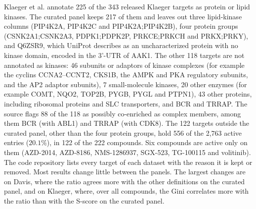 \documentclass[11pt]{article}
\begin{document}
Klaeger et al.\cite{Klaeger2017} annotate 225 of the 343 released Klaeger targets as protein or
lipid kinases. The curated panel keeps 217 of them and leaves out three
lipid-kinase columns (PIP4K2A, PIP4K2C and PIP4K2A;\allowbreak PIP4K2B), four
protein groups (CSNK2A1;\allowbreak CSNK2A3, PDPK1;\allowbreak PDPK2P,
PRKCE;\allowbreak PRKCH and PRKX;\allowbreak PRKY), and Q6ZSR9, which UniProt
describes as an uncharacterized protein with no kinase domain, encoded in the
3'-UTR of AAK1. The other 118 targets are not annotated as kinases: 46 subunits
or adaptors of kinase complexes (for example the cyclins CCNA2--CCNT2, CKS1B,
the AMPK and PKA regulatory subunits, and the AP2 adaptor subunits), 7
small-molecule kinases, 20 other enzymes (for example COMT, NQO2, TOP2B, PYGB,
PYGL and PTPN1), 43 other proteins, including ribosomal proteins and SLC
transporters, and BCR and TRRAP. The source flags 88 of the 118 as possibly
co-enriched as complex members, among them BCR (with ABL1) and TRRAP (with
CDK8). The 122 targets outside the curated panel, other than the four protein
groups, hold 556 of the 2{,}763 active entries ($20.1\%$), in 122 of the 222
compounds. Six compounds are active only on them (AZD-2014, AZD-8186,
NMS-1286937, SGX-523, TG-100115 and volitinib). The code repository lists every
target of each dataset with the reason it is kept or removed. Most results
change little between the panels. The largest changes are on Davis, where the
ratio agrees more with the other definitions on the curated panel, and on
Klaeger, where, over all compounds, the Gini correlates more with the
ratio than with the S-score on the curated panel.
\end{document}
